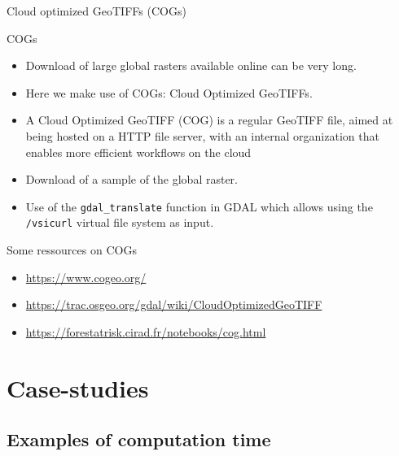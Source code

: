 \documentclass[10pt,table,dvipsnames,compress]{beamer}
\begin{document}
\begin{frame}[label={sec:orgb3d86cf},fragile]{Cloud optimized GeoTIFFs (COGs)}
 \begin{block}{COGs}
\begin{itemize}
\item Download of large global rasters available online can be very long.
\item Here we make use of COGs: Cloud Optimized GeoTIFFs.
\item A Cloud Optimized GeoTIFF (COG) is a regular GeoTIFF file, aimed at being hosted on a HTTP file server, with an internal organization that enables more efficient workflows on the cloud
\item Download of a sample of the global raster.
\item Use of the \texttt{gdal\_translate} function in GDAL which allows using the \texttt{/vsicurl} virtual file system as input.
\end{itemize}
\end{block}

\begin{block}{Some ressources on COGs}
\begin{itemize}
\item \url{https://www.cogeo.org/}
\item \url{https://trac.osgeo.org/gdal/wiki/CloudOptimizedGeoTIFF}
\item \url{https://forestatrisk.cirad.fr/notebooks/cog.html}
\end{itemize}
\end{block}
\end{frame}


\section{Case-studies}
\label{sec:org065495f}

\subsection{Examples of computation time}
\label{sec:orgf4543f9}
\end{document}
